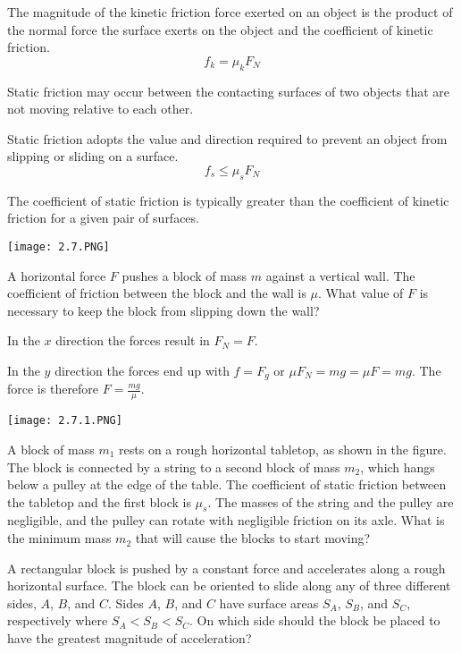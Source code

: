 \documentclass[../mech.tex]{subfiles}
\begin{document}
The magnitude of the kinetic friction force exerted on an object is the product of the normal force the surface exerts on the object and the coefficient of kinetic friction.
\[ f_k = \mu_k F_N \]

Static friction may occur between the contacting surfaces of two objects that are not moving relative to each other.

Static friction adopts the value and direction required to prevent an object from slipping or sliding on a surface.
\[ f_s \leq \mu_s F_N \]

The coefficient of static friction is typically greater than the coefficient of kinetic friction for a given pair of surfaces.

\begin{example}
    \begin{center}
        \texttt{[image: 2.7.PNG]}
    \end{center}
    A horizontal force $F$ pushes a block of mass $m$ against a vertical wall. The coefficient of friction between the block and the wall is $\mu$. What value of $F$ is necessary to keep the block from slipping down the wall?

    In the $x$ direction the forces result in $F_N=F$.

    In the $y$ direction the forces end up with $f=F_g$ or $\mu F_N= mg = \mu F = mg$. The force is therefore $F=\frac{mg}{\mu}$.
\end{example}

\ex \begin{center}
    \texttt{[image: 2.7.1.PNG]}
\end{center}
A block of mass $m_1$ rests on a rough horizontal tabletop, as shown in the figure. The block is connected by a string to a second block of mass $m_2$, which hangs below a pulley at the edge of the table.
The coefficient of static friction between the tabletop and the first block is $\mu_s$. The masses of the string and the pulley are negligible, and the pulley can rotate with negligible friction on its axle.
What is the minimum mass $m_2$ that will cause the blocks to start moving?

\ex A rectangular block is pushed by a constant force and accelerates along a rough horizontal surface. The block can be oriented to slide along any of three different sides, $A$, $B$, and $C$. Sides $A$, $B$, and $C$ have surface areas 
$S_A$, $S_B$, and $S_C$, respectively where $S_A<S_B<S_C$. On which side should the block be placed to have the greatest magnitude of acceleration?
\end{document}
